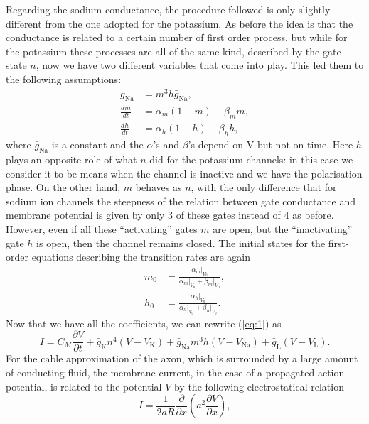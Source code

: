\documentclass[a4paper,11pt ]{report}
\theoremstyle{definition}
\begin{document}
Regarding the sodium conductance, the procedure followed is only slightly different from the one adopted for the potassium. As before the idea is that the conductance is related to a certain number of first order process, but while for the potassium these processes are all of the same kind, described by the gate state $n$, now we have two different variables that come into play. This led them to the following assumptions:
\begin{align}
g_\text{Na}&=m^3h\bar{g}_\text{Na},\nonumber\\
\frac{dm}{dt}&=\alpha_m(1-m)-\beta_mm,\label{gate_m}\\
\frac{dh}{dt}&=\alpha_h(1-h)-\beta_hh\label{gate_h},
\end{align}
where $\bar{g}_\text{Na}$ is a constant and the $\alpha$'s and $\beta$'s depend on V but not on time. Here $h$ plays an opposite role of what $n$ did for the potassium channels: in this case we consider it to be means when the channel is inactive and we have the polarisation phase. On the other hand, $m$ behaves as $n$, with the only difference that for sodium ion channels the steepness of the relation between gate conductance and membrane potential is given by only $3$ of these gates instead of $4$ as before. However, even if all these \enquote{activating} gates $m$ are open, but the \enquote{inactivating} gate $h$ is open, then the channel remains closed. The initial states for the first-order equations describing the transition rates are again
\begin{align*}
m_0&=\frac{\alpha_m\vert_{V_0}}{\alpha_m\vert_{V_0}+\beta_m\vert_{V_0}},\\
h_0&=\frac{\alpha_h\vert_{V_0}}{\alpha_h\vert_{V_0}+\beta_h\vert_{V_0}}.
\end{align*}
Now that we have all the coefficients, we can rewrite (\ref{eq:1}) as
\begin{equation}\label{demifinal}
I=C_M\frac{\partial V}{\partial t}+\bar{g}_\text{K}n^4(V-V_\text{K})+ \bar{g}_\text{Na}m^3h(V-V_\text{Na})+\bar{g}_\text{L}(V-V_\text{L}).
\end{equation}
For the cable approximation of the axon, which is surrounded by a large amount of conducting fluid, the membrane current, in the case of a propagated action potential, is related to the potential $V$ by the following electrostatical relation
\begin{equation*}
I=\frac{1}{2aR}\frac{\partial}{\partial x}\left(a^2\frac{\partial V}{\partial x}\right),
\end{equation*} 
\end{document}
